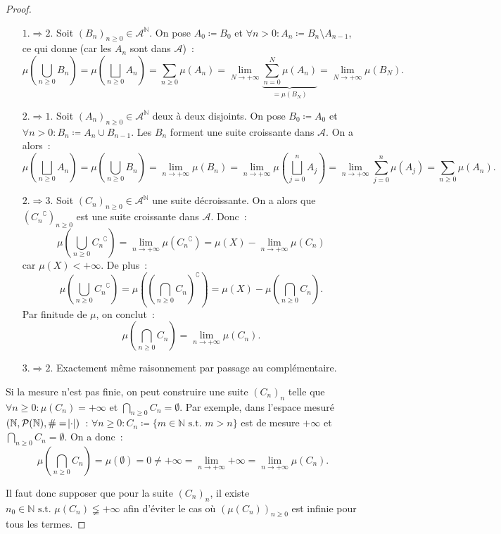 \documentclass{article}
\newcommand{\pinfty}{{+\infty}}
\newcommand{\st}{\text{ s.t. }}
\newcommand{\C}{\complement}
\newcommand{\N}{{\mathbb N}}
\begin{document}
\begin{proof}~
\begin{itemize}
	\item[\underline {$1. \Rightarrow 2.$}] Soit $(B_n)_{n \geq 0} \in \mathcal A^\N$. On pose $A_0 \coloneqq B_0$ et $\forall n > 0 : A_n \coloneqq B_n \setminus A_{n-1}$,
	ce qui donne (car les $A_n$ sont dans $\mathcal A$)~:
	\[\mu\left(\bigcup_{n \geq 0}B_n\right) = \mu\left(\bigsqcup_{n \geq 0}A_n\right) = \sum_{n \geq 0}\mu(A_n)
	  = \lim_{N \to \pinfty}\underbrace {\sum_{n=0}^N\mu(A_n)}_{= \mu(B_N)} = \lim_{N \to \pinfty}\mu(B_N).\]
	\item[\underline {$2. \Rightarrow 1.$}] Soit $(A_n)_{n \geq 0} \in \mathcal A^\N$ deux à deux disjoints.
	On pose $B_0 \coloneqq A_0$ et $\forall n > 0 : B_n \coloneqq A_n \cup B_{n-1}$. Les $B_n$ forment une suite croissante dans $\mathcal A$. On a alors~:
	\[\mu\left(\bigsqcup_{n \geq 0}A_n\right) = \mu\left(\bigcup_{n \geq 0}B_n\right) = \lim_{n \to \pinfty}\mu(B_n) = \lim_{n \to \pinfty}\mu\left(\bigsqcup_{j=0}^nA_j\right)
	  = \lim_{n \to \pinfty}\sum_{j=0}^n\mu(A_j) = \sum_{n \geq 0}\mu(A_n).\]
	\item[\underline {$2. \Rightarrow 3.$}] Soit $(C_n)_{n \geq 0} \in \mathcal A^\N$ une suite décroissante. On a alors que $({C_n}^\C)_{n \geq 0}$ est une suite croissante dans
	$\mathcal A$. Donc~:
	\[\mu\left(\bigcup_{n \geq 0}{C_n}^\C\right) = \lim_{n \to \pinfty}\mu({C_n}^\C) = \mu(X) - \lim_{n \to \pinfty}\mu(C_n)\]
	car $\mu(X) < \pinfty$. De plus~:
	\[\mu\left(\bigcup_{n \geq 0}{C_n}^\C\right) = \mu\left(\left(\bigcap_{n \geq 0}C_n\right)^\C\right) = \mu(X) - \mu\left(\bigcap_{n \geq 0}C_n\right).\]
	Par finitude de $\mu$, on conclut~:
	\[\mu\left(\bigcap_{n \geq 0}C_n\right) = \lim_{n \to \pinfty}\mu(C_n).\]
	\item[\underline {$3. \Rightarrow 2.$}] Exactement même raisonnement par passage au complémentaire.
\end{itemize}

Si la mesure n'est pas finie, on peut construire une suite $(C_n)_n$ telle que $\forall n \geq 0 : \mu(C_n) = \pinfty$ et $\bigcap_{n \geq 0}C_n = \emptyset$. Par exemple,
dans l'espace mesuré $(\N, \mathcal P(\N), \# = \abs \cdot)$~: $\forall n \geq 0 : C_n \coloneqq \{m \in \N \st m > n\}$ est de mesure $\pinfty$ et
$\bigcap_{n \geq 0}C_n = \emptyset$. On a donc~:
\[\mu\left(\bigcap_{n \geq 0}C_n\right) = \mu(\emptyset) = 0 \neq \pinfty = \lim_{n \to \pinfty}\pinfty = \lim_{n \to \pinfty}\mu(C_n).\]

Il faut donc supposer que pour la suite $(C_n)_n$, il existe $n_0 \in \N \st \mu(C_n) \lneqq \pinfty$ afin d'éviter le cas où $(\mu(C_n))_{n \geq 0}$ est infinie pour tous les termes.
\end{proof}
\end{document}
